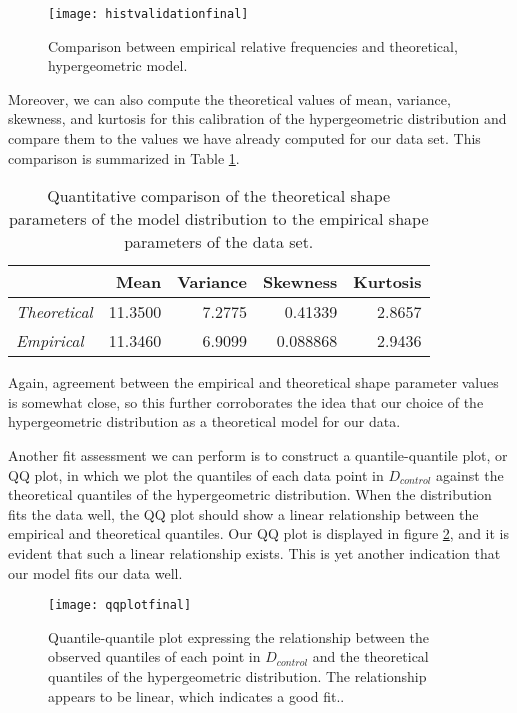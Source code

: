 \documentclass{amsart}
\begin{document}
\begin{figure}
\centering
\texttt{[image: histvalidationfinal]}
\caption{
Comparison between empirical relative frequencies and theoretical, hypergeometric model.\label{F:graphicalAssessement}}
\end{figure}
Moreover, we can also compute the theoretical values of mean, variance, skewness, and kurtosis for this calibration of the hypergeometric distribution and compare them to the values we have already computed for our data set. This comparison is summarized in Table \ref{Tbl:quantitativeAssessment}.
\begin{table}
\begin{tabular}{lrrrr}
\toprule
			&	{\bf Mean}	&	{\bf Variance}	&	{\bf Skewness}	&	{\bf Kurtosis}\\\midrule
{\sl Theoretical}	&	11.3500	&	7.2775		&	0.41339		&	2.8657\\ 
{\sl Empirical}		&	11.3460	&	6.9099		&	0.088868		&	2.9436\\
\bottomrule
\end{tabular}
 \caption{Quantitative comparison of the theoretical shape parameters of the model distribution to the empirical shape parameters of the data set.\label{Tbl:quantitativeAssessment}}
\end{table}
Again, agreement between the empirical and theoretical shape parameter values is somewhat close, so this further corroborates the idea that our choice of the hypergeometric distribution as a theoretical model for our data. 

Another fit assessment we can perform is to construct a quantile-quantile plot, or QQ plot, in which we plot the quantiles of each data point in $D_{control}$ against the theoretical quantiles of the hypergeometric distribution. When the distribution fits the data well, the QQ plot should show a linear relationship between the empirical and theoretical quantiles. Our QQ plot is displayed in figure \ref{F:qqplot}, and it is evident that such a linear relationship exists. This is yet another indication that our model fits our data well.
\begin{figure}
\centering
\texttt{[image: qqplotfinal]}
\caption{
Quantile-quantile plot expressing the relationship between the observed quantiles of each point in $D_{control}$ and the theoretical quantiles of the hypergeometric distribution. The relationship appears to be linear, which indicates a good fit..\label{F:qqplot}}
\end{figure}
\end{document}
